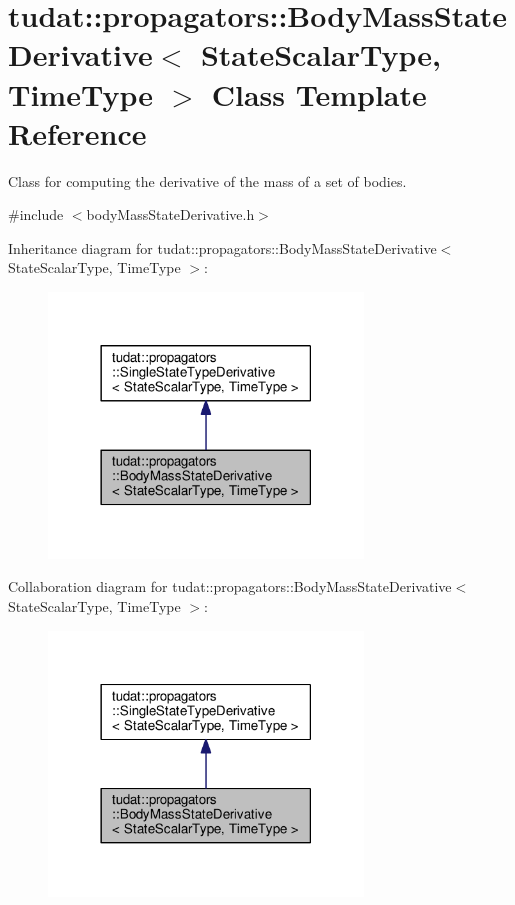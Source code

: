 \hypertarget{classtudat_1_1propagators_1_1BodyMassStateDerivative}{}\section{tudat\+:\+:propagators\+:\+:Body\+Mass\+State\+Derivative$<$ State\+Scalar\+Type, Time\+Type $>$ Class Template Reference}
\label{classtudat_1_1propagators_1_1BodyMassStateDerivative}


Class for computing the derivative of the mass of a set of bodies.  




{\ttfamily \#include $<$body\+Mass\+State\+Derivative.\+h$>$}



Inheritance diagram for tudat\+:\+:propagators\+:\+:Body\+Mass\+State\+Derivative$<$ State\+Scalar\+Type, Time\+Type $>$\+:
\nopagebreak
\begin{figure}[H]
\begin{center}
\leavevmode
\includegraphics[width=237pt]{classtudat_1_1propagators_1_1BodyMassStateDerivative__inherit__graph}
\end{center}
\end{figure}


Collaboration diagram for tudat\+:\+:propagators\+:\+:Body\+Mass\+State\+Derivative$<$ State\+Scalar\+Type, Time\+Type $>$\+:
\nopagebreak
\begin{figure}[H]
\begin{center}
\leavevmode
\includegraphics[width=237pt]{classtudat_1_1propagators_1_1BodyMassStateDerivative__coll__graph}
\end{center}
\end{figure}
